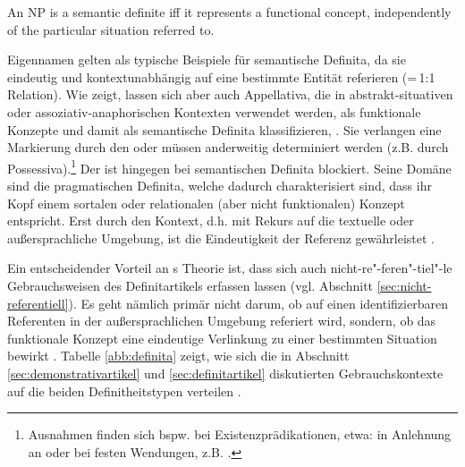 \begin{exe}
	\ex \label{semdef}  An NP is a semantic definite iff it represents a functional concept, independently of the particular situation referred to. \parencite[299]{Lobner1985}
\end{exe}

Eigennamen  gelten als typische Beispiele für semantische  Definita, da sie eindeutig und kontextunabhängig auf eine bestimmte Entität referieren (=\,1:1 Relation). Wie \textcite[299--307]{Lobner1985} zeigt, lassen sich aber auch  Appellativa, die in abstrakt-situativen  oder assoziativ-anaphorischen  Kontexten verwendet werden, als funktionale Konzepte und damit als semantische Definita  klassifizieren, \parencite[s. hierzu auch ausführlich][104--110]{Demske2001}. Sie verlangen eine Markierung durch den  oder müssen anderweitig determiniert werden (z.B. durch Possessiva).\footnote{Ausnahmen finden sich bspw. bei Existenzprädikationen, etwa:  in Anlehnung an \textcite[297]{Lobner1985} oder bei festen Wendungen, z.B.  \parencite[311]{Lobner1985}.}
Der  ist hingegen bei semantischen Definita  blockiert. Seine Domäne sind die pragmatischen  Definita, welche dadurch charakterisiert sind, dass ihr Kopf einem sortalen oder relationalen (aber nicht funktionalen) Konzept entspricht. Erst durch den Kontext, d.h. mit Rekurs auf die textuelle oder außersprachliche Umgebung, ist die Eindeutigkeit der Referenz gewährleistet \parencite[307]{Lobner1985}. 

Ein entscheidender Vorteil an \citeauthor{Lobner1985}s Theorie ist, dass sich auch nicht-re"-feren"-tiel"-le Gebrauchsweisen des Definitartikels erfassen lassen (vgl. Abschnitt \ref{sec:nicht-referentiell}). Es geht nämlich primär nicht darum, ob auf einen  identifizierbaren Referenten in der außersprachlichen Umgebung referiert wird, sondern, ob das funktionale Konzept eine eindeutige Verlinkung zu einer bestimmten Situation bewirkt \parencite[304--307]{Lobner1985}. Tabelle \ref{abb:definita} zeigt, wie sich die in Abschnitt \ref{sec:demonstrativartikel} und \ref{sec:definitartikel} diskutierten Gebrauchskontexte auf die beiden Definitheitstypen verteilen \parencite[angelehnt an und erweitert nach][73]{Szczepaniak2011a}. 

